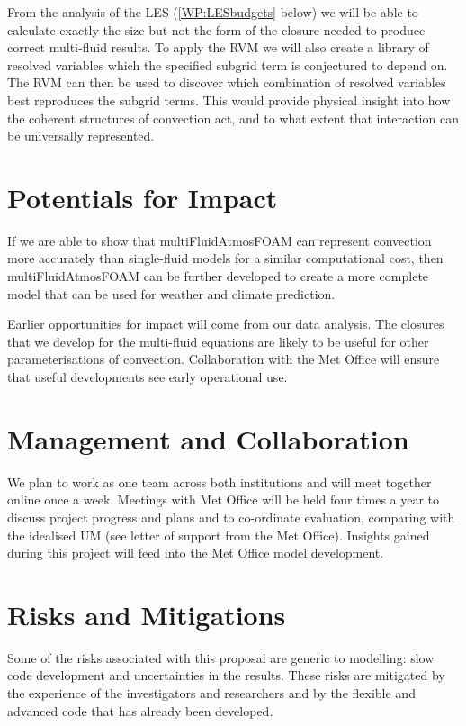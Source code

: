 \documentclass[11pt,a4paper]{article}
\begin{document}
From the analysis of the LES (\ref{WP:LESbudgets} below) we will be able to calculate exactly the size but not the form of the closure needed to produce correct multi-fluid results. To apply the RVM we will also create a library of resolved variables which the specified subgrid term is conjectured to depend on. The RVM can then be used to discover which combination of resolved variables best reproduces the subgrid terms. This would provide physical insight into how the coherent structures of convection act, and to what extent that interaction can be universally represented.

\section{Potentials for Impact}

If we are able to show that multiFluidAtmosFOAM can represent convection more accurately than single-fluid models for a similar computational cost, then multiFluidAtmosFOAM can be further developed to create a more complete model that can be used for weather and climate prediction.

Earlier opportunities for impact will come from our data analysis. The closures that we develop for the multi-fluid equations are likely to be useful for other parameterisations of convection. Collaboration with the Met Office will ensure that useful developments see early operational use. 

\section{Management and Collaboration}

We plan to work as one team across both institutions and will meet together online once a week. Meetings with Met Office will be held four times a year to discuss project progress and plans and to co-ordinate evaluation, comparing with the idealised UM (see letter of support from the Met Office). Insights gained during this project will feed into the Met Office model development.

\section{Risks and Mitigations}

Some of the risks associated with this proposal are generic to modelling: slow code development and uncertainties in the results. These risks are mitigated by the experience of the investigators and researchers and by the flexible and advanced code that has already been developed.
\end{document}
